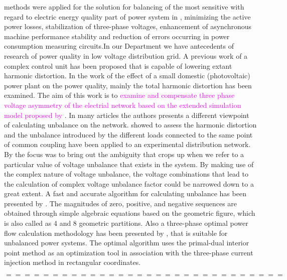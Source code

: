 methods were applied for the solution for balancing of the most sensitive with regard to electric energy quality part of power system in \cite{uimethod},  minimizing the active power losses, stabilization of three-phase voltages, enhancement of asynchronous machine performance stability and reduction of errors occurring in power consumption measuring circuits.In our Department we have antecedents of research of power quality in low voltage  distribution grid. A previous work of \cite{gorbe2012reduction} a complex control unit has been proposed that is capable of lowering extant harmonic distortion. In the work of \cite{Gorbe2014experimental} the effect of a small domestic (photovoltaic) power plant on the power quality, mainly the total harmonic distortion has been examined. The aim of this work is to \textcolor{magenta}{examine and compensate three phase voltage asymmetry of the electrial network based on the extended simulation model proposed by \cite{gorbe2012reduction}}.
    In many articles the authors presents a different viewpoint of calculating unbalance on the network. \cite{martin2015unbalance} showed to assess the harmonic distortion and the unbalance introduced by the different loads connected to the same point of common coupling have been applied to an experimental distribution network.  By \cite{kini2007novel} the focus was to bring out the ambiguity that crops up when we refer to a particular value of voltage unbalance that exists in the system. By making use of the complex nature of voltage unbalance, the voltage combinations that lead to the calculation of complex voltage unbalance factor could be narrowed down to a great extent. A fast and accurate algorithm for calculating unbalance has been presented by \cite{wen2014approximate}. The magnitudes of zero, positive, and negative sequences are obtained through simple algebraic equations based on the geometric figure, which is also called as 4 and 8 geometric partitions. Also a three-phase optimal power flow calculation methodology has been presented by \cite{araujo2013three}, that is suitable for unbalanced power systems. The optimal algorithm uses the primal-dual interior point method as an optimization tool in association with the three-phase current injection method in rectangular coordinates.%

    $$ ============================== $$\\

